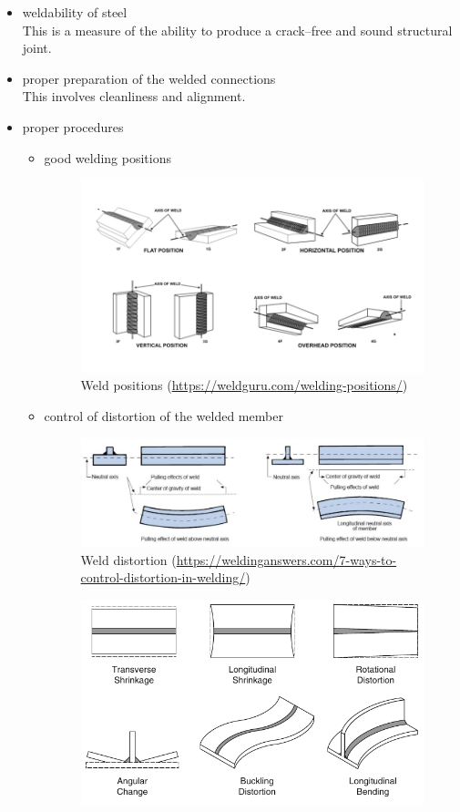 \begin{itemize}
\item weldability of steel\\This is a measure of the ability to produce a crack--free and sound structural joint.
\item proper preparation of the welded connections\\This involves cleanliness and alignment.
\item proper procedures
\begin{itemize}
\item good welding positions
\begin{figure}[H]
\centering
\includegraphics[width=14cm]{PIC/CH07/WP}
\caption{Weld positions (\href{https://weldguru.com/welding-positions/}{\url{https://weldguru.com/welding-positions/}})}
\end{figure}
\item control of distortion of the welded member
\begin{figure}[H]
\centering
\includegraphics[width=14cm]{PIC/CH07/WD}
\caption{Weld distortion (\href{https://weldinganswers.com/7-ways-to-control-distortion-in-welding/}{\url{https://weldinganswers.com/7-ways-to-control-distortion-in-welding/}})}
\end{figure}
\begin{figure}[H]
\centering
\includegraphics{PIC/CH07/WDD}

\end{figure}
\end{itemize}
\end{itemize}

